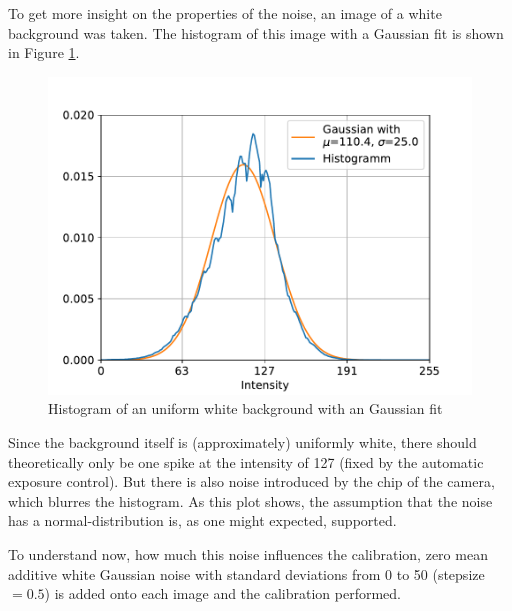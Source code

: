 To get more insight on the properties of the noise, an image of a white background was taken.
The histogram of this image with a Gaussian fit is shown in Figure \ref{development:noise_dist}.
\begin{figure}
	\centering
	\includegraphics[width=0.9\linewidth]{3-development/calibration/images/noise_distribution.pdf}
	\caption{Histogram of an uniform white background with an Gaussian fit\label{development:noise_dist}}
\end{figure}
Since the background itself is (approximately) uniformly white, there should theoretically only be one spike at the intensity of 127 (fixed by the automatic exposure control).
But there is also noise introduced by the chip of the camera, which blurres the histogram.
As this plot shows, the assumption that the noise has a normal-distribution is, as one might expected, supported.

To understand now, how much this noise influences the calibration, zero mean additive white Gaussian noise with standard deviations from 0 to 50 (stepsize $=0.5$) is added onto each image and the calibration performed. 

